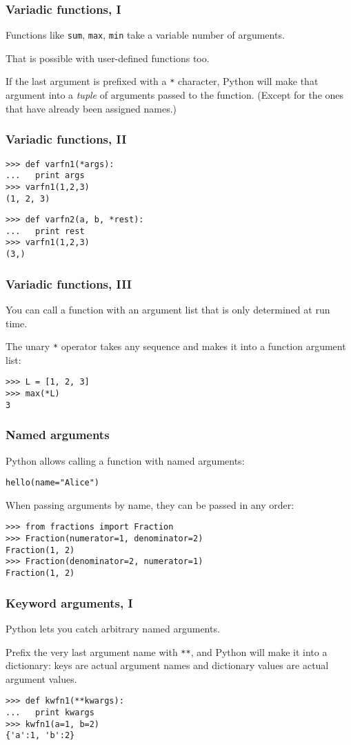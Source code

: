 \documentclass[english,serif,mathserif,xcolor=pdftex,dvipsnames,table]{beamer}
\begin{document}
\begin{frame}[fragile]
  \frametitle{Variadic functions, I}
  Functions like \texttt{sum}, \texttt{max}, \texttt{min} take a variable number of arguments.

  \+
  That is possible with user-defined functions too.

  \+ 
  If the last argument is prefixed with a \texttt{*} character,
  Python will make that argument into a \emph{tuple} of arguments
  passed to the function. (Except for the ones that have already been
  assigned names.)
\end{frame}


\begin{frame}
  \frametitle{Variadic functions, II}
\begin{lstlisting}
>>> def varfn1(*args):
...   print args
>>> varfn1(1,2,3)
(1, 2, 3)
\end{lstlisting}

\begin{lstlisting}
>>> def varfn2(a, b, *rest):
...   print rest
>>> varfn1(1,2,3)
(3,)
\end{lstlisting}
\end{frame}


\begin{frame}[fragile]
  \frametitle{Variadic functions, III}
  You can call a function with an argument list that is only
  determined at run time.

  \+ 
  The unary \texttt{*} operator takes any sequence and makes it
  into a function argument list:
\begin{lstlisting}
>>> L = [1, 2, 3]
>>> max(*L)
3
\end{lstlisting}
\end{frame}


\begin{frame}[fragile]
  \frametitle{Named arguments}
Python allows calling a function with named arguments:
\begin{lstlisting}
hello(name="Alice")
\end{lstlisting}
When passing arguments by name, they can be passed in any order:
\begin{lstlisting}
>>> from fractions import Fraction
>>> Fraction(numerator=1, denominator=2)
Fraction(1, 2)
>>> Fraction(denominator=2, numerator=1)
Fraction(1, 2)
\end{lstlisting}
\end{frame}


\begin{frame}[fragile]
  \frametitle{Keyword arguments, I}
  Python lets you catch arbitrary named arguments.

  \+ 
  Prefix the very last argument name with \texttt{**}, and Python
  will make it into a dictionary: keys are actual argument names and
  dictionary values are actual argument values.

  \+
\begin{lstlisting}
>>> def kwfn1(**kwargs):
...   print kwargs
>>> kwfn1(a=1, b=2)
{'a':1, 'b':2}
\end{lstlisting}
\end{frame}
\end{document}
